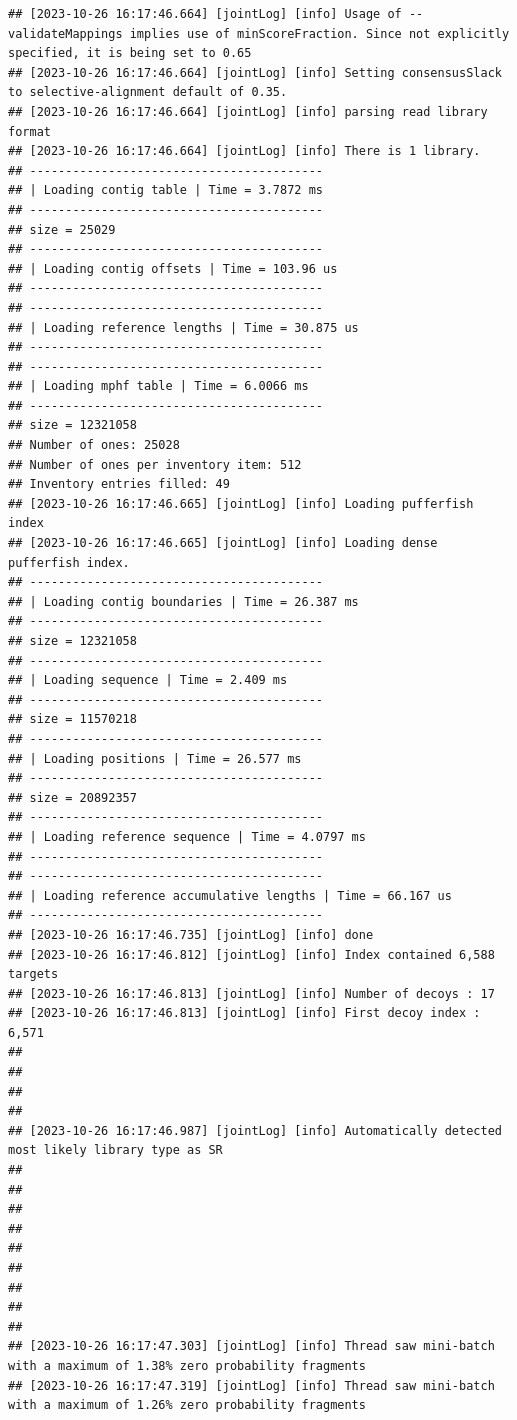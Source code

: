 \documentclass[
]{book}
\begin{document}
\begin{verbatim}
## [2023-10-26 16:17:46.664] [jointLog] [info] Usage of --validateMappings implies use of minScoreFraction. Since not explicitly specified, it is being set to 0.65
## [2023-10-26 16:17:46.664] [jointLog] [info] Setting consensusSlack to selective-alignment default of 0.35.
## [2023-10-26 16:17:46.664] [jointLog] [info] parsing read library format
## [2023-10-26 16:17:46.664] [jointLog] [info] There is 1 library.
## -----------------------------------------
## | Loading contig table | Time = 3.7872 ms
## -----------------------------------------
## size = 25029
## -----------------------------------------
## | Loading contig offsets | Time = 103.96 us
## -----------------------------------------
## -----------------------------------------
## | Loading reference lengths | Time = 30.875 us
## -----------------------------------------
## -----------------------------------------
## | Loading mphf table | Time = 6.0066 ms
## -----------------------------------------
## size = 12321058
## Number of ones: 25028
## Number of ones per inventory item: 512
## Inventory entries filled: 49
## [2023-10-26 16:17:46.665] [jointLog] [info] Loading pufferfish index
## [2023-10-26 16:17:46.665] [jointLog] [info] Loading dense pufferfish index.
## -----------------------------------------
## | Loading contig boundaries | Time = 26.387 ms
## -----------------------------------------
## size = 12321058
## -----------------------------------------
## | Loading sequence | Time = 2.409 ms
## -----------------------------------------
## size = 11570218
## -----------------------------------------
## | Loading positions | Time = 26.577 ms
## -----------------------------------------
## size = 20892357
## -----------------------------------------
## | Loading reference sequence | Time = 4.0797 ms
## -----------------------------------------
## -----------------------------------------
## | Loading reference accumulative lengths | Time = 66.167 us
## -----------------------------------------
## [2023-10-26 16:17:46.735] [jointLog] [info] done
## [2023-10-26 16:17:46.812] [jointLog] [info] Index contained 6,588 targets
## [2023-10-26 16:17:46.813] [jointLog] [info] Number of decoys : 17
## [2023-10-26 16:17:46.813] [jointLog] [info] First decoy index : 6,571 
## 
## 
## 
## 
## [2023-10-26 16:17:46.987] [jointLog] [info] Automatically detected most likely library type as SR
## 
## 
## 
## 
## 
## 
## 
## 
## 
## [2023-10-26 16:17:47.303] [jointLog] [info] Thread saw mini-batch with a maximum of 1.38% zero probability fragments
## [2023-10-26 16:17:47.319] [jointLog] [info] Thread saw mini-batch with a maximum of 1.26% zero probability fragments

\end{verbatim}
\end{document}
